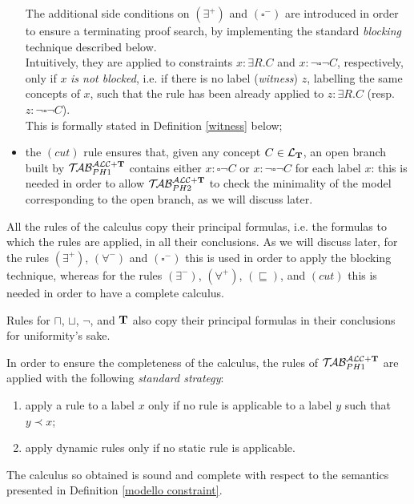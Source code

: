 \documentclass[a4paper, 11pt, oneside]{duthesis}
\newcommand{\tip}{{\bf T}}
\newcommand{\nott} {\lnot}
\newcommand{\bbox}{\square}
\newcommand{\perogni} {\forall}
\newcommand{\esiste} {\exists}
\newcommand{\ellet} {\mathcal{L}_{\bf T}}
\newcommand{\primo}{\mathrel{{\mathcal{T}\!\mathcal{AB}}}_{PH 1}^{\mathcal{ALC}+\mbox{\scriptsize $\tip$}}}
\newcommand{\secondo}{\mathrel{{\mathcal{T}\!\mathcal{AB}}}_{PH 2}^{\mathcal{ALC}+\mbox{\scriptsize $\tip$}}}
\begin{document}
\begin{itemize}
The additional side conditions on $(\esiste^{+})$ and $(\bbox^{-})$ are introduced in order to ensure a terminating proof search, by implementing the standard \emph{blocking} technique described below.\\
Intuitively, they are applied to constraints $x: \esiste R.C$ and $x: \nott \bbox \nott C$, respectively, only if $x$ \emph{is not blocked}, i.e. if there is no label (\emph{witness}) $z$, labelling the same concepts of $x$, such that the rule has been already applied to $z: \esiste R.C$ (resp. $z: \nott \bbox \nott C$).\\
This is formally stated in Definition \ref{witness} below;

\item the $(cut)$ rule ensures that, given any concept $C \in \ellet$, an open branch built by $\primo$ contains either $x: \bbox \nott C$ or $x: \nott \bbox \nott C$ for each label $x$: this is needed in order to allow $\secondo$ to check the minimality of the model corresponding to the open branch, as we will discuss later.
\end{itemize}


\noindent All the rules of the calculus copy their principal formulas, i.e. the formulas to which the rules are applied, in all their conclusions.
As we will discuss later, for the rules $(\esiste^+)$, $(\perogni^-)$ and $(\bbox^-)$ this is used in order to apply the blocking technique, whereas for the rules $(\esiste^-)$, $(\perogni^+)$, $(\sqsubseteq)$, and $(cut)$ this is needed in order to have a complete calculus.

Rules for $\sqcap$, $\sqcup$, $\nott$, and $\tip$ also copy their principal formulas in their conclusions for uniformity's sake.

\newpage

In order to ensure the completeness of the calculus, the rules of $\primo$ are applied with the following \emph{standard strategy}:
\begin{enumerate}
\item apply a rule to a label $x$ only if no rule is applicable to a label $y$ such that $y \prec x$;
\item apply dynamic rules only if no static rule is applicable.
\end{enumerate}


The calculus so obtained is sound and complete with respect to the semantics presented in Definition \ref{modello constraint}.
\end{document}
